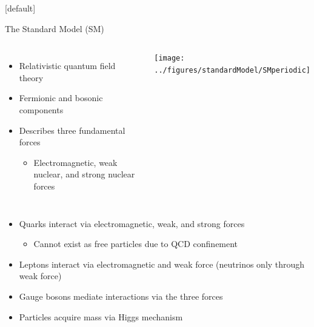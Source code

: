 \documentclass{beamer}
\begin{document}
{  \makeatletter %
  [default]
  \def\beamer@entrycode{\vspace*{-1.075\headheight}}
  \begin{frame} {The Standard Model (SM)}
    \vspace{5pt}
    \begin{columns}
      \begin{itemize}\small
      \item Relativistic quantum field theory
      \item Fermionic and bosonic components
      \item Describes three fundamental forces
        \begin{itemize}
        \item Electromagnetic, weak nuclear, and strong nuclear forces 
        \end{itemize}
      \end{itemize}
      \texttt{[image: ../figures/standardModel/SMperiodic]}
    \end{columns}
    \vspace{-4pt}
    \begin{itemize}\small
    \item Quarks interact via electromagnetic, weak, and strong forces
    \begin{itemize}\footnotesize
    \item Cannot exist as free particles due to QCD confinement
    \end{itemize}
    \item Leptons interact via electromagnetic and weak force (neutrinos only through weak force)
    \item Gauge bosons mediate interactions via the three forces
    \item Particles acquire mass via Higgs mechanism
    \end{itemize}
  \end{frame}

}
\end{document}
